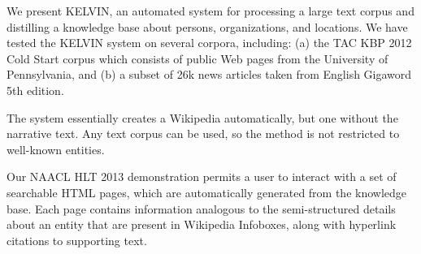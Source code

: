 We present KELVIN, an automated system for processing a large text corpus and distilling a knowledge base about persons, organizations, and locations. We
 have tested the KELVIN system on several corpora, including: (a) the TAC KBP
 2012 Cold Start corpus which consists of public Web pages from the University
 of Pennsylvania, and (b) a subset of 26k news articles taken from English
 Gigaword 5th edition.
 
 The system essentially creates a Wikipedia automatically, but one without the
 narrative text. Any text corpus can be used, so the method is not restricted to
 well-known entities.
 
 Our NAACL HLT 2013 demonstration permits a user to interact with a set of
 searchable HTML pages, which are automatically generated from the knowledge
 base. Each page contains information analogous to the semi-structured details
 about an entity that are present in Wikipedia Infoboxes, along with hyperlink
 citations to supporting text.

